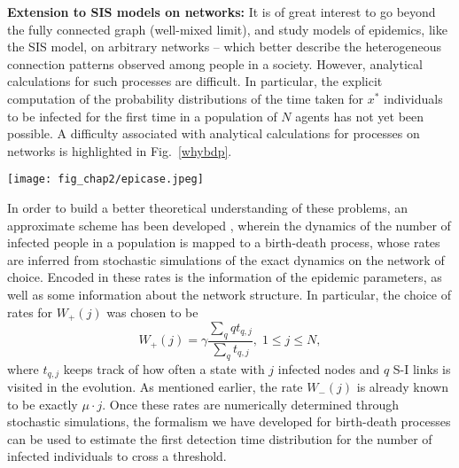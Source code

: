 \textbf{Extension to SIS models on networks:} It is of great interest to go beyond the fully connected graph (well-mixed limit), and study models of epidemics, like the SIS model, on arbitrary networks -- which better describe the heterogeneous connection patterns observed among people in a society. However, analytical calculations for such processes are difficult. In particular, the explicit computation of the probability distributions of the time taken for $x^*$ individuals to be infected for the first time in a population of $N$ agents has not yet been possible. A difficulty associated with analytical calculations for processes on networks is highlighted in Fig.~\ref{whybdp}.
\begin{figure*}[h]
    \centering
    \texttt{[image: fig\_chap2/epicase.jpeg]}
    \caption{A schematic of two scenarios in the SIS model, both of which have $3$ infected (red) individuals. The blue circles denote the agents which are at risk of getting infected. While the effective rate at which the number of infected individuals will drop from $3$ to $2$ is $3\mu$ in both the configurations, the rate for the number of infected people to go from $3$ to $4$ is different for both configurations -- (a) $6\gamma$ and (b) $3\gamma$. Thus, it is difficult to theoretically define a single effective rate by which the number of infected individuals in the population changes from $n$ to $n+1$, as the rates depend on the specific configuration that the process is in.}
    \label{whybdp}
\end{figure*}

In order to build a better theoretical understanding of these problems, an approximate scheme has been developed \cite{kiss_mathematics_2017,nagy_approximate_2014,di_lauro_network_2020}, wherein the dynamics of the number of infected people in a population is mapped to a birth-death process, whose rates are inferred from stochastic simulations of the exact dynamics on the network of choice. Encoded in these rates is the information of the epidemic parameters, as well as some information about the network structure. In particular, the choice of rates for $W_+{(j)}$ was chosen to be
\begin{equation}
	W_+{(j)}= \gamma\frac{\sum_{q}qt_{q,j}}{\sum_{q} t_{q,j}},\;1\leq j\leq N,
	\label{Eq:average_ak}
\end{equation}
where $t_{q,j}$ keeps track of how often a state with $j$ infected nodes and $q$ S-I links is visited in the evolution. As mentioned earlier, the rate $W_-(j)$ is already known to be exactly $\mu \cdot j$. Once these rates are numerically determined through stochastic simulations, the formalism we have developed for birth-death processes can be used to estimate the first detection time distribution for the number of infected individuals to cross a threshold. 


